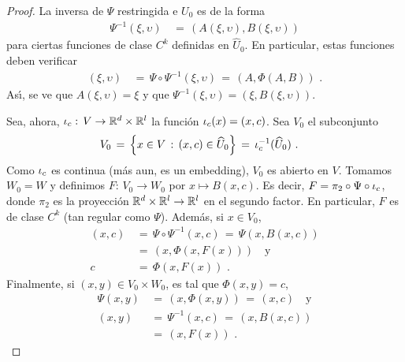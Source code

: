 \begin{proof}
	La inversa de $\Psi$ restringida e $U_{0}$ es de la forma
	\begin{align*}
		\Psi^{-1}(\xi,\upsilon) & \,=\,
			(A(\xi,\upsilon),B(\xi,\upsilon))
	\end{align*}
	para ciertas funciones de clase $C^{k}$ definidas en $\widehat{U}_{0}$.
	En particular, estas funciones deben verificar
	\begin{align*}
		(\xi,\upsilon) & \,=\, \Psi\circ\Psi^{-1}(\xi,\upsilon) \,=\,
			(A,\Phi(A,B))
		\text{ .}
	\end{align*}
	As\'{\i}, se ve que $A(\xi,\upsilon)=\xi$ y que
	$\Psi^{-1}(\xi,\upsilon)=(\xi,B(\xi,\upsilon))$.

	Sea, ahora, $\inc[c]:\,V\rightarrow\bb{R}^{d}\times\bb{R}^{l}$ la
	funci\'{o}n $\inc[c](x)=(x,c)$. Sea $V_{0}$ el subconjunto
	\begin{align*}
		V_{0} & \,=\,\left\lbrace x\in V\,:\,(x,c)\in\widehat{U}_{0}
			\right\rbrace
		\,=\,\inc[c]^{-1}(\widehat{U}_{0})
		\text{ .}
	\end{align*}
	Como $\inc[c]$ es continua (m\'{a}s aun, es un embedding), $V_{0}$
	es abierto en $V$. Tomamos $W_{0}=W$ y definimos
	$F:\,V_{0}\rightarrow W_{0}$ por $x\mapsto B(x,c)$. Es decir,
	$F=\pi_{2}\circ\Psi\circ\inc[c]$, donde $\pi_{2}$ es la
	proyecci\'{o}n $\bb{R}^{d}\times\bb{R}^{l}\rightarrow\bb{R}^{l}$
	en el segundo factor. En particular, $F$ es de clase $C^{k}$ (tan
	regular como $\Psi$). Adem\'{a}s, si $x\in V_{0}$,
	\begin{align*}
		(x,c) & \,=\,\Psi\circ\Psi^{-1}(x,c) \,=\,\Psi(x,B(x,c)) \\
		& \,=\,(x,\Phi(x,F(x)))\quad\text{y} \\
		c & \,=\,\Phi(x,F(x))
		\text{ .}
	\end{align*}
	Finalmente, si $(x,y)\in V_{0}\times W_{0}$, es tal que $\Phi(x,y)=c$,
	\begin{align*}
		\Psi(x,y) & \,=\,(x,\Phi(x,y)) \,=\, (x,c)\quad\text{y} \\
		(x,y) & \,=\,\Psi^{-1}(x,c) \,=\, (x,B(x,c)) \\
		& \,=\,(x,F(x))
		\text{ .}
	\end{align*}
\end{proof}
